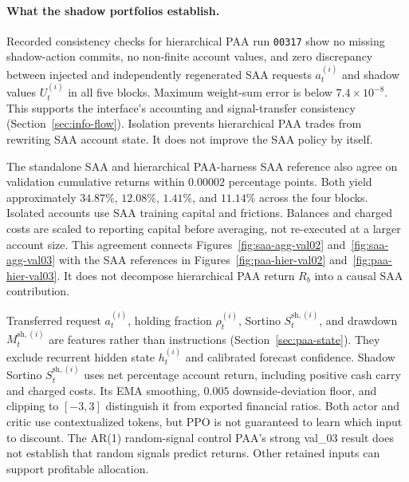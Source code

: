 \paragraph{What the shadow portfolios establish.}
Recorded consistency checks for hierarchical PAA run \texttt{00317} show no missing shadow-action commits, no non-finite account values, and zero discrepancy between injected and independently regenerated SAA requests \(a_t^{(i)}\) and shadow values \(U_t^{(i)}\) in all five blocks. Maximum weight-sum error is below \(7.4\times10^{-8}\). This supports the interface's accounting and signal-transfer consistency (Section~\ref{sec:info-flow}). Isolation prevents hierarchical PAA trades from rewriting SAA account state. It does not improve the SAA policy by itself.

The standalone SAA and hierarchical PAA-harness SAA reference also agree on validation cumulative returns within \(0.00002\) percentage points. Both yield approximately \(34.87\%\), \(12.08\%\), \(1.41\%\), and \(11.14\%\) across the four blocks. Isolated accounts use SAA training capital and frictions. Balances and charged costs are scaled to reporting capital before averaging, not re-executed at a larger account size. This agreement connects Figures~\ref{fig:saa-agg-val02} and~\ref{fig:saa-agg-val03} with the SAA references in Figures~\ref{fig:paa-hier-val02} and~\ref{fig:paa-hier-val03}. It does not decompose hierarchical PAA return \(R_b\) into a causal SAA contribution.

Transferred request \(a_t^{(i)}\), holding fraction \(\rho_t^{(i)}\), Sortino \(S_t^{\mathrm{sh},(i)}\), and drawdown \(M_t^{\mathrm{sh},(i)}\) are features rather than instructions (Section~\ref{sec:paa-state}). They exclude recurrent hidden state \(h_t^{(i)}\) and calibrated forecast confidence. Shadow Sortino \(S_t^{\mathrm{sh},(i)}\) uses net percentage account return, including positive cash carry and charged costs. Its EMA smoothing, \(0.005\) downside-deviation floor, and clipping to \([-3,3]\) distinguish it from exported financial ratios. Both actor and critic use contextualized tokens, but PPO is not guaranteed to learn which input to discount. The AR(1) random-signal control PAA's strong val\_03 result does not establish that random signals predict returns. Other retained inputs can support profitable allocation.

